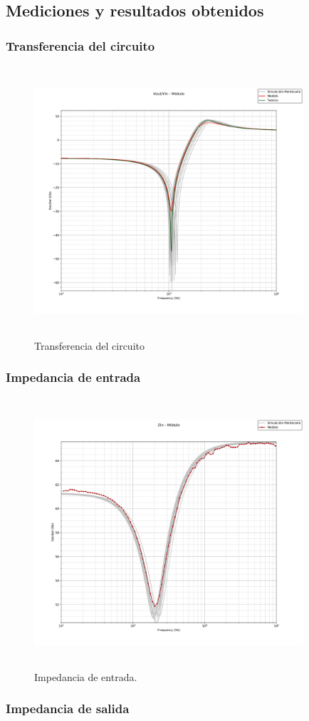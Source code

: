\subsection{Mediciones y resultados obtenidos}

\subsubsection{Transferencia del circuito}

\begin{figure}[H] %
	\centering
	\includegraphics[width=10cm,height=10cm,keepaspectratio]{../EJ1/00GRAFICOS/vovi.png}
	\caption{Transferencia del circuito}
	\label{c1vinmax}
\end{figure}


\subsubsection{Impedancia de entrada}

\begin{figure}[H] %
	\centering
	\includegraphics[width=10cm,height=10cm,keepaspectratio]{../EJ1/00GRAFICOS/zin_modulo_sinTeorico.png}
	\caption{Impedancia de entrada.}
	\label{c1vinmax}
\end{figure}

\subsubsection{Impedancia de salida}